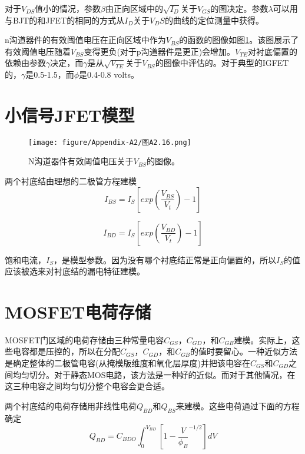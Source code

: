 对于$V_{DS}$值小的情况，参数$\beta$由正向区域中的$\sqrt{I_D}$关于$V_{GS}$的图决定。参数$\lambda$可以用与BJT的和JFET的相同的方式从$I_D$关于$V_DS$的曲线的定位测量中获得。

n沟道器件的有效阈值电压在正向区域中作为$V_{BS}$的函数的图像如图\ref{图A2.16}。该图展示了有效阈值电压随着$V_{BS}$变得更负(对于p沟道器件是更正)会增加。$V_{TE}$对衬底偏置的依赖由参数$\gamma$决定，而$\gamma$是从$\sqrt{V_{TE}}$关于$V_{BS}$的图像中评估的。对于典型的IGFET的，$\gamma$是0.5-1.5，而$\phi$是0.4-0.8 volts。

\section{小信号JFET模型}
\begin{figure}[htbp]
\small
    \centering
    \texttt{[image: figure/Appendix-A2/图A2.16.png]}
    \caption{N沟道器件有效阈值电压关于$V_{BS}$的图像。}
    \label{图A2.16}
\end{figure}

两个衬底结由理想的二极管方程建模
\begin{equation}
    I_{BS} = I_S[exp(\frac{V_{BS}}{V_t})-1]
    \label{eq:A2.60}
\end{equation}

\begin{equation}
    I_{BD} = I_S[exp(\frac{V_{BD}}{V_t})-1]
    \label{eq:A2.61}
\end{equation}

饱和电流，$I_S$，是模型参数。因为没有哪个衬底结正常是正向偏置的，所以$I_S$的值应该被选来对衬底结的漏电特征建模。

\section{MOSFET电荷存储}
MOSFET门区域的电荷存储由三种常量电容$C_{GS}$，$C_{GD}$，和$C_{GB}$建模。实际上，这些电容都是压控的，所以在分配$C_{GS}$，$C_{GD}$，和$C_{GB}$的值时要留心。一种近似方法是确定整体的二极管电容(从掩模版维度和氧化层厚度)并把该电容在$C_{GS}$和$C_{GD}$之间均匀切分。对于静态MOS电路\cite{ref-90}，该方法是一种好的近似。而对于其他情况，在这三种电容之间均匀切分整个电容会更合适。

两个衬底结的电荷存储用非线性电荷$Q_{BD}$和$Q_{BS}$来建模。这些电荷通过下面的方程确定
\begin{equation}
    Q_{BD} = C_{BDO}\int^{V_{BD}}_0[1-\frac{V}{\phi_B}^{-1/2}]dV
    \label{eq:A2.62}
\end{equation}

